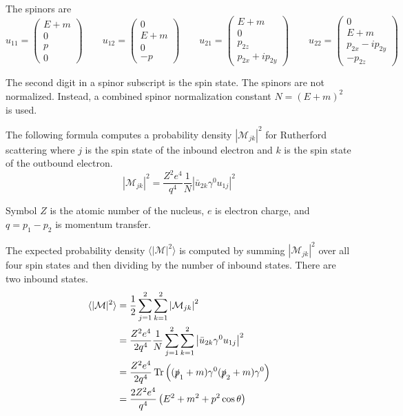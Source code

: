 \documentclass[12pt]{article}
\begin{document}
\bigskip
\noindent
The spinors are
\begin{equation*}
u_{11}=\begin{pmatrix}E+m\\0\\p\\0\end{pmatrix}
\qquad
u_{12}=\begin{pmatrix}0\\E+m\\0\\-p\end{pmatrix}
\qquad
u_{21}=\begin{pmatrix}E+m\\0\\p_{2z}\\p_{2x}+ip_{2y}\end{pmatrix}
\qquad
u_{22}=\begin{pmatrix}0\\E+m\\p_{2x}-ip_{2y}\\-p_{2z}\end{pmatrix}
\end{equation*}

\noindent
The second digit in a spinor subscript is the spin state.
The spinors are not normalized.
Instead, a combined spinor normalization constant $N=(E+m)^2$ is used.

\bigskip
\noindent
The following formula computes a probability density $|\mathcal{M}_{jk}|^2$ for Rutherford scattering
where $j$ is the spin state of the inbound electron and $k$ is the spin state of the outbound electron.
\begin{equation*}
|\mathcal{M}_{jk}|^2=\frac{Z^2e^4}{q^4}\frac{1}{N}\left|\bar{u}_{2k}\gamma^0 u_{1j}\right|^2
\end{equation*}

\noindent
Symbol $Z$ is the atomic number of the nucleus,
$e$ is electron charge,
and $q=p_1-p_2$ is momentum transfer.

\bigskip
\noindent
The expected probability density
$\langle\vert\mathcal{M}\vert^2\rangle$
is computed by summing $|\mathcal{M}_{jk}|^2$
over all four spin states and then dividing by the number of inbound states.
There are two inbound states.
\begin{align*}
\langle\vert\mathcal{M}\vert^2\rangle
&=\frac{1}{2}\sum_{j=1}^2\sum_{k=1}^2\left|\mathcal{M}_{jk}\right|^2
\\
&=\frac{Z^2e^4}{2q^4}\frac{1}{N}\sum_{j=1}^2\sum_{k=1}^2\left|\bar{u}_{2k}\gamma^0 u_{1j}\right|^2
\\
&=\frac{Z^2e^4}{2q^4}\mathop{\rm Tr}\left((\slashed{p}_1+m)\gamma^0(\slashed{p}_2+m)\gamma^0\right)
\\
&=\frac{2Z^2e^4}{q^4}\left(E^2+m^2+p^2\cos\theta\right)
\end{align*}
\end{document}

